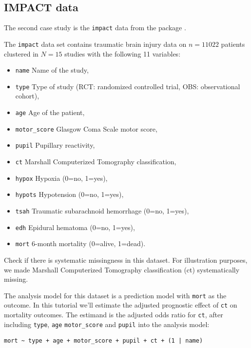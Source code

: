 \documentclass[
  article]{jss}
\providecommand{\tightlist}{%
  \setlength{\itemsep}{0pt}\setlength{\parskip}{0pt}}\usepackage{longtable,booktabs,array}
\begin{document}
\hypertarget{impact-data}{%
\subsection{IMPACT data}\label{impact-data}}

The second case study is the \texttt{impact} data from the
 package \citep[empirical data on traumatic brain
injuries, \(n = 11,022\) units across \(N = 15\) clusters,][]{metamisc}.

The \texttt{impact} data set contains traumatic brain injury data on
\(n = 11022\) patients clustered in \(N = 15\) studies with the
following 11 variables:

\begin{itemize}
\tightlist
\item
  \texttt{name} Name of the study,
\item
  \texttt{type} Type of study (RCT: randomized controlled trial, OBS:
  observational cohort),
\item
  \texttt{age} Age of the patient,
\item
  \texttt{motor\_score} Glasgow Coma Scale motor score,
\item
  \texttt{pupil} Pupillary reactivity,
\item
  \texttt{ct} Marshall Computerized Tomography classification,
\item
  \texttt{hypox} Hypoxia (0=no, 1=yes),
\item
  \texttt{hypots} Hypotension (0=no, 1=yes),
\item
  \texttt{tsah} Traumatic subarachnoid hemorrhage (0=no, 1=yes),
\item
  \texttt{edh} Epidural hematoma (0=no, 1=yes),
\item
  \texttt{mort} 6-month mortality (0=alive, 1=dead).
\end{itemize}

Check if there is systematic missingness in this dataset. For
illustration purposes, we made Marshall Computerized Tomography
classification (ct) systematically missing.

The analysis model for this dataset is a prediction model with
\texttt{mort} as the outcome. In this tutorial we'll estimate the
adjusted prognostic effect of \texttt{ct} on mortality outcomes. The
estimand is the adjusted odds ratio for \texttt{ct}, after including
\texttt{type}, \texttt{age} \texttt{motor\_score} and \texttt{pupil}
into the analysis model:

\begin{verbatim}
mort ~ type + age + motor_score + pupil + ct + (1 | name) 
\end{verbatim}
\end{document}
